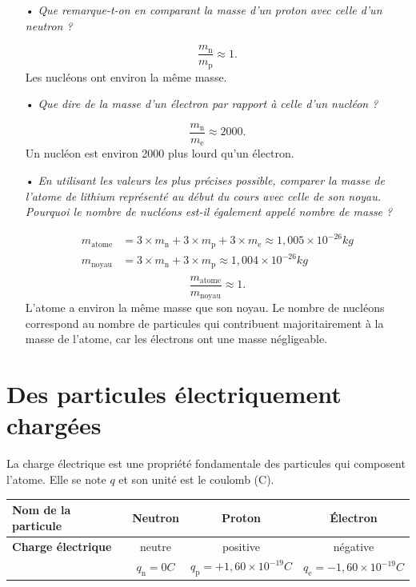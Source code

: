 \documentclass[12pt,a4paper]{article}
\begin{document}
\begin{itemize}
\item[•] \emph{Que remarque-t-on en comparant la masse d'un proton avec celle d'un neutron ?}

\[
\frac{m_\mathrm{n}}{m_\mathrm{p}} \approx 1.
\]
Les nucléons ont environ la même masse.

\item[•] \emph{Que dire de la masse d'un électron par rapport à celle d'un nucléon ?}

\[
\frac{m_\mathrm{n}}{m_\mathrm{e}} \approx 2000.
\]
Un nucléon est environ 2000 plus lourd qu'un électron.

\item[•] \emph{En utilisant les valeurs les plus précises possible, comparer la masse de l'atome de lithium représenté au début du cours avec celle de son noyau.
Pourquoi le nombre de nucléons est-il également appelé nombre de masse ?}

\begin{align*}
m_\mathrm{atome} &= 3 \times m_\mathrm{n} + 3 \times m_\mathrm{p} + 3 \times m_\mathrm{e} \approx \unit{1{,}005\times10^{-26}}{kg} \\
m_\mathrm{noyau} &= 3 \times m_\mathrm{n} + 3 \times m_\mathrm{p} \approx \unit{1{,}004\times10^{-26}}{kg} \\
\end{align*}
\[
\frac{m_\mathrm{atome}}{m_\mathrm{noyau}} \approx 1.
\]
L'atome a environ la même masse que son noyau.
Le nombre de nucléons correspond au nombre de particules qui contribuent majoritairement à la masse de l'atome, car les électrons ont une masse négligeable.

\end{itemize}

\section{Des particules électriquement chargées}

La charge électrique est une propriété fondamentale des particules qui composent l'atome.
Elle se note $q$ et son unité est le coulomb (C).
\begin{center}
\begin{tabular}{l|c|c|c}
\textbf{Nom de la particule} & Neutron & Proton & Électron \\
\hline
\textbf{Charge électrique} 	& neutre 	& positive 	& négative \\
							& $q_\mathrm{n} = \unit{0}{C}$ & $q_\mathrm{p} = \unit{+1{,}60\times10^{-19}}{C}$ & $q_\mathrm{e} = \unit{-1{,}60\times10^{-19}}{C}$
\end{tabular}
\end{center}
\end{document}
